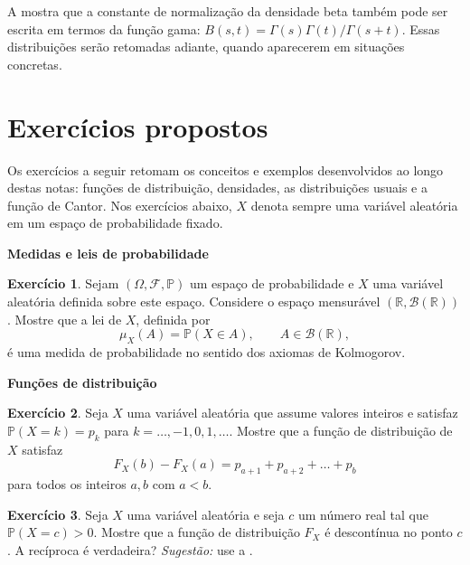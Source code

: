 \documentclass[12pt,portuguese]{article}
\theoremstyle{definition}
\theoremstyle{plainexercise}
\newtheorem{exercise}{Exercício}
\theoremstyle{starredexercise}
\theoremstyle{definition}
\begin{document}
A  mostra que a constante de
normalização da densidade beta também pode ser escrita em termos da função
gama: $B(s,t) = \Gamma(s)\Gamma(t)/\Gamma(s+t)$. Essas distribuições serão
retomadas adiante, quando aparecerem em situações concretas.


\break  
\section{Exercícios propostos}
\label{sec:exercicios-funcoes-distribuicao}

Os exercícios a seguir retomam os conceitos e exemplos desenvolvidos ao longo
destas notas: funções de distribuição, densidades, as distribuições usuais e a
função de Cantor. Nos exercícios abaixo, $X$ denota sempre uma variável
aleatória em um espaço de probabilidade fixado.

\medskip
\noindent\textbf{Medidas e leis de probabilidade}

\begin{exercise}\label{exercise:lei-medida-probabilidade}
  Sejam $(\Omega,\mathcal{F},\mathbb{P})$ um espaço de probabilidade e $X$ uma
  variável aleatória definida sobre este espaço. Considere o espaço mensurável
  $(\mathbb{R},\mathscr{B}(\mathbb{R}))$. Mostre que a lei de $X$, definida por
  \[
    \mu_X(A)=\mathbb{P}(X\in A), \qquad A\in\mathscr{B}(\mathbb{R}),
  \]
  é uma medida de probabilidade no sentido dos axiomas de Kolmogorov.
\end{exercise}

\medskip
\noindent\textbf{Funções de distribuição}

\begin{exercise}\label{exercise:soma-massas-intervalo}
  Seja $X$ uma variável aleatória que assume valores inteiros e satisfaz
  $\mathbb{P}(X = k) = p_k$ para $k = \dots, -1, 0, 1, \dots$. Mostre que a
  função de distribuição de $X$ satisfaz
  \[
    F_X(b) - F_X(a) = p_{a+1} + p_{a+2} + \dots + p_b
  \]
  para todos os inteiros $a, b$ com $a < b$.
\end{exercise}

\begin{exercise}\label{exercise:descontinuidade-ponto-massa}
  Seja $X$ uma variável aleatória e seja $c$ um número real tal que
  $\mathbb{P}(X = c) > 0$. Mostre que a função de distribuição $F_X$ é
  descontínua no ponto $c$. A recíproca é verdadeira?
  \emph{Sugestão:} use a .
\end{exercise}
\end{document}
